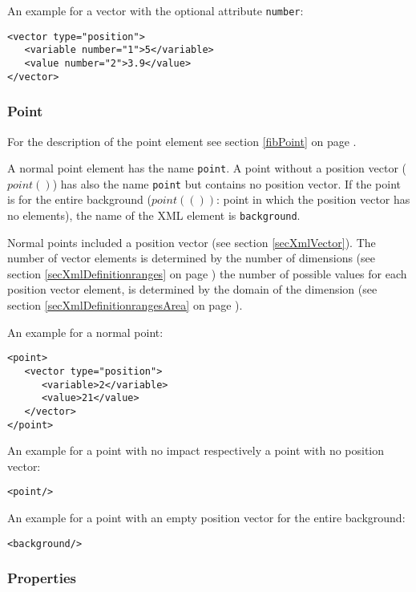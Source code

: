 \noindent
An example for a vector with the optional attribute \verb|number|:
\begin{verbatim}
<vector type="position">
   <variable number="1">5</variable>
   <value number="2">3.9</value>
</vector>
\end{verbatim}



\subsubsection{Point}

For the description of the point element see section \ref{fibPoint} on page \pageref{fibPoint} .

A normal point element has the name \verb|point|. A point without a position vector ($point()$) has also the name \verb|point| but contains no position vector.
If the point is for the entire background ($point(())$: point in which the position vector has no elements), the name of the XML element is \verb|background|.

Normal points included a position vector (see section \ref{secXmlVector}). The number of vector elements is determined by the number of dimensions (see section \ref{secXmlDefinitionranges} on page \pageref{secXmlDefinitionranges}) the number of possible values for each position vector element, is determined by the domain of the dimension (see section \ref{secXmlDefinitionrangesArea} on page \pageref{secXmlDefinitionrangesArea}).

\bigskip\noindent
An example for a normal point:
\begin{verbatim}
<point>
   <vector type="position">
      <variable>2</variable>
      <value>21</value>
   </vector>
</point>
\end{verbatim}

\noindent
An example for a point with no impact respectively a point with no position vector:
\begin{verbatim}
<point/>
\end{verbatim}

\noindent
An example for a point with an empty position vector for the entire background:
\begin{verbatim}
<background/>
\end{verbatim}



\subsubsection{Properties}
\label{secXmlProperty}

